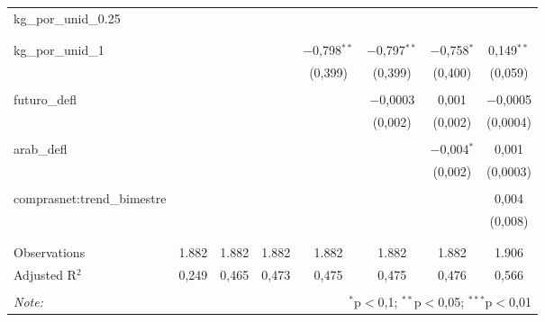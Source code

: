 \begin{table}[!htbp]
\begin{tabular}{@{\extracolsep{5pt}}lccccccc}
 kg\_por\_unid\_0.25 &  &  &  &  &  &  &  \\ 
  &  &  &  &  &  &  &  \\ 
  & & & & & & & \\ 
 kg\_por\_unid\_1 &  &  &  & $-$0,798$^{**}$ & $-$0,797$^{**}$ & $-$0,758$^{*}$ & 0,149$^{**}$ \\ 
  &  &  &  & (0,399) & (0,399) & (0,400) & (0,059) \\ 
  & & & & & & & \\ 
 futuro\_defl &  &  &  &  & $-$0,0003 & 0,001 & $-$0,0005 \\ 
  &  &  &  &  & (0,002) & (0,002) & (0,0004) \\ 
  & & & & & & & \\ 
 arab\_defl &  &  &  &  &  & $-$0,004$^{*}$ & 0,001 \\ 
  &  &  &  &  &  & (0,002) & (0,0003) \\ 
  & & & & & & & \\ 
 comprasnet:trend\_bimestre &  &  &  &  &  &  & 0,004 \\ 
  &  &  &  &  &  &  & (0,008) \\ 
  & & & & & & & \\ 
\hline \\[-1.8ex] 
Observations & 1.882 & 1.882 & 1.882 & 1.882 & 1.882 & 1.882 & 1.906 \\ 
Adjusted R$^{2}$ & 0,249 & 0,465 & 0,473 & 0,475 & 0,475 & 0,476 & 0,566 \\ 
\hline 
\hline \\[-1.8ex] 
\textit{Note:}  & \multicolumn{7}{r}{$^{*}$p$<$0,1; $^{**}$p$<$0,05; $^{***}$p$<$0,01} \\ 
\end{tabular} 
\end{table} 
